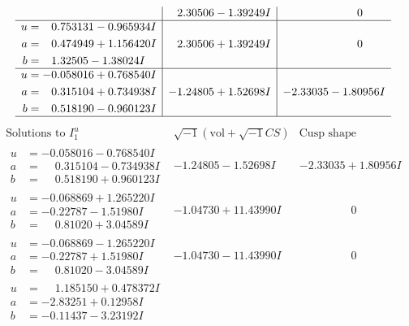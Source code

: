 \documentclass[1p]{elsarticle_modified}
\theoremstyle{definition}
\newcommand{\I}{\sqrt{-1}}
\begin{document}
$$\begin{array}{c|c|c}
 & \phantom{-}2.30506 - 1.39249 I & \phantom{-0.000000 } 0 \\ \hline\begin{aligned}
u &= \phantom{-}0.753131 - 0.965934 I \\
a &= \phantom{-}0.474949 + 1.156420 I \\
b &= \phantom{-}1.32505 - 1.38024 I\end{aligned}
 & \phantom{-}2.30506 + 1.39249 I & \phantom{-0.000000 } 0 \\ \hline\begin{aligned}
u &= -0.058016 + 0.768540 I \\
a &= \phantom{-}0.315104 + 0.734938 I \\
b &= \phantom{-}0.518190 - 0.960123 I\end{aligned}
 & -1.24805 + 1.52698 I & -2.33035 - 1.80956 I\\
 \hline 
 \end{array}$$\newpage$$\begin{array}{c|c|c}  
\text{Solutions to }I^u_{1}& \I (\text{vol} + \sqrt{-1}CS) & \text{Cusp shape}\\
 \hline 
\begin{aligned}
u &= -0.058016 - 0.768540 I \\
a &= \phantom{-}0.315104 - 0.734938 I \\
b &= \phantom{-}0.518190 + 0.960123 I\end{aligned}
 & -1.24805 - 1.52698 I & -2.33035 + 1.80956 I \\ \hline\begin{aligned}
u &= -0.068869 + 1.265220 I \\
a &= -0.22787 - 1.51980 I \\
b &= \phantom{-}0.81020 + 3.04589 I\end{aligned}
 & -1.04730 + 11.43990 I & \phantom{-0.000000 } 0 \\ \hline\begin{aligned}
u &= -0.068869 - 1.265220 I \\
a &= -0.22787 + 1.51980 I \\
b &= \phantom{-}0.81020 - 3.04589 I\end{aligned}
 & -1.04730 - 11.43990 I & \phantom{-0.000000 } 0 \\ \hline\begin{aligned}
u &= \phantom{-}1.185150 + 0.478372 I \\
a &= -2.83251 + 0.12958 I \\
b &= -0.11437 - 3.23192 I\end{aligned}

\end{array}$$
\end{document}
